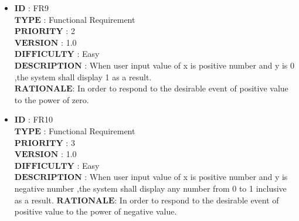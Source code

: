 \documentclass[a4paper, 11pt]{article}
\begin{document}
\begin{itemize}
   \item $\boldsymbol{ID}$\hspace{2.95cm}   : FR9\\
   $\boldsymbol{TYPE}$\hspace{2.2cm}   : Functional Requirement\\
   $\boldsymbol{PRIORITY}$\hspace{1.05cm} : 2\\
   $\boldsymbol{VERSION}$\hspace{1.25cm} : 1.0\\
   $\boldsymbol{DIFFICULTY}$\hspace{0.4cm} : Easy \\
   $\boldsymbol{DESCRIPTION}$    :  When user input value of x is positive number and y is 0 ,the system shall display 1 as a result.\\
   $\boldsymbol{RATIONALE}$\hspace{0.8cm}: In order to respond to the desirable event of positive value to the power of zero.\\
   
   
   \item $\boldsymbol{ID}$\hspace{2.95cm}   : FR10\\
    $\boldsymbol{TYPE}$\hspace{2.2cm}   : Functional Requirement\\
   $\boldsymbol{PRIORITY}$\hspace{1.05cm} : 3\\
   $\boldsymbol{VERSION}$\hspace{1.25cm} : 1.0\\
   $\boldsymbol{DIFFICULTY}$\hspace{0.4cm} : Easy \\
   $\boldsymbol{DESCRIPTION}$   :  When user input value of x is positive number and y is negative number ,the system shall display any number from 0 to 1 inclusive as a result.
    $\boldsymbol{RATIONALE}$\hspace{0.8cm}: In order to respond to the desirable event of positive value to the power of negative value.\\
   

\end{itemize}
\end{document}
